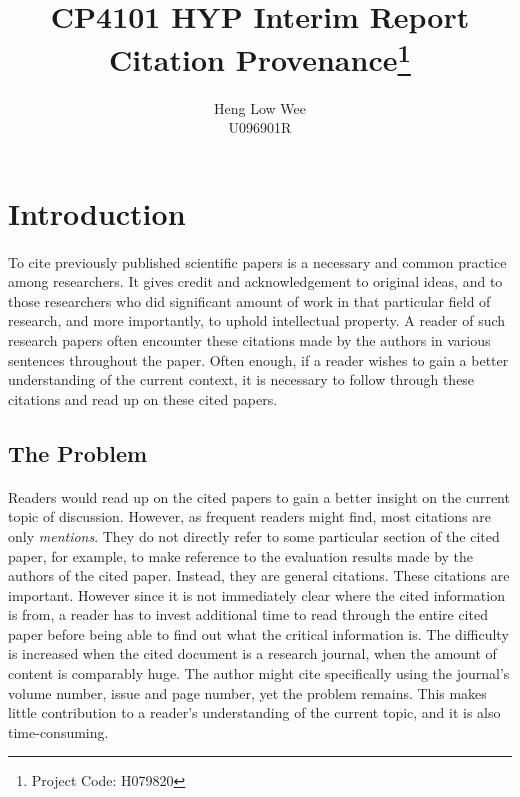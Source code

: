 \documentclass[12 pt]{article}
\begin{document}

\title{CP4101 HYP Interim Report \\ Citation Provenance\footnote{Project Code: H079820}}
\author{Heng Low Wee \\ U096901R}
\maketitle

\section{Introduction}
\paragraph{}
To cite previously published scientific papers is a necessary and common practice among researchers. It gives credit and acknowledgement to original ideas, and to those researchers who did significant amount of work in that particular field of research, and more importantly, to uphold intellectual property. A reader of such research papers often encounter these citations made by the authors in various sentences throughout the paper. Often enough, if a reader wishes to gain a better understanding of the current context, it is necessary to follow through these citations and read up on these cited papers.

\subsection{The Problem}
\paragraph{}
Readers would read up on the cited papers to gain a better insight on the current topic of discussion. However, as frequent readers might find, most citations are only \textit{mentions}. They do not directly refer to some particular section of the cited paper, for example, to make reference to the evaluation results made by the authors of the cited paper. Instead, they are general citations. These citations are important. However since it is not immediately clear where the cited information is from, a reader has to invest additional time to read through the entire cited paper before being able to find out what the critical information is. The difficulty is increased when the cited document is a research journal, when the amount of content is comparably huge. The author might cite specifically using the journal's volume number, issue and page number, yet the problem remains. This makes little contribution to a reader's understanding of the current topic, and it is also time-consuming.
\end{document}
